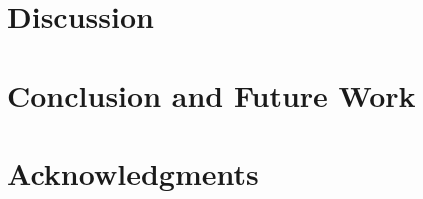 \documentclass{article}
\begin{document}
\section{Discussion}

\section{Conclusion and Future Work}

\section{Acknowledgments}




\end{document}

